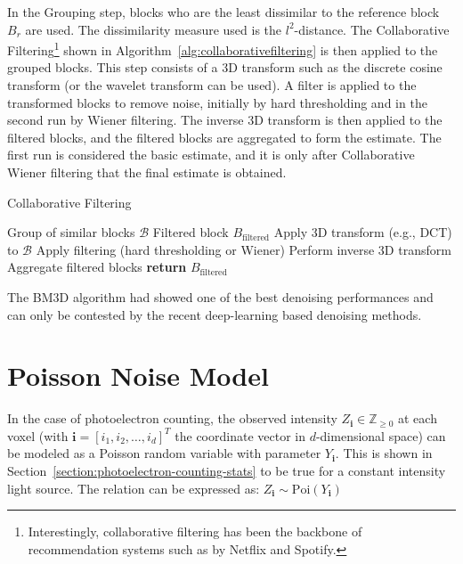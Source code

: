In the Grouping step, blocks who are the least dissimilar to the reference block $B_r$ are used. The dissimilarity measure used is the $l^2$-distance. The Collaborative Filtering\footnote{Interestingly, collaborative filtering has been the backbone of recommendation systems such as by Netflix and Spotify.} shown in Algorithm~\ref{alg:collaborativefiltering} is then applied to the grouped blocks. This step consists of a 3D transform such as the discrete cosine transform (or the wavelet transform can be used). A filter is applied to the transformed blocks to remove noise, initially by hard thresholding and in the second run by Wiener filtering. The inverse 3D transform is then applied to the filtered blocks, and the filtered blocks are aggregated to form the estimate. The first run is considered the basic estimate, and it is only after Collaborative Wiener filtering that the final estimate is obtained.
    
\begin{algorithm}
    \caption{Collaborative Filtering}\label{alg:collaborativefiltering}
    \begin{algorithmic}[1]
    \Require Group of similar blocks $\mathcal{B}$
    \Ensure Filtered block $B_{\text{filtered}}$
        \State Apply 3D transform (e.g., DCT) to $\mathcal{B}$
        \State Apply filtering (hard thresholding or Wiener)
        \State Perform inverse 3D transform
        \State Aggregate filtered blocks
        \State \textbf{return} $B_{\text{filtered}}$
    \EndProcedure
    \end{algorithmic}
\end{algorithm}

The \gls{BM3D} algorithm had showed one of the best denoising performances and can only be contested by the recent deep-learning based denoising methods. 

\section{Poisson Noise Model}\label{sec:poisson-noise-model}
In the case of photoelectron counting, the observed intensity $Z_{\mathbf{i}} \in \mathbb{Z}_{\geq 0}$ at each voxel (with $\mathbf{i} = [i_1, i_2, \dots, i_d]^T$ the coordinate vector in $d$-dimensional space) can be modeled as a Poisson random variable with parameter $Y_{\mathbf{i}}$. This is shown in Section~\ref{section:photoelectron-counting-stats} to be true for a constant intensity light source. The relation can be expressed as: $Z_{\mathbf{i}} \sim \text{Poi}(Y_{\mathbf{i}})$

